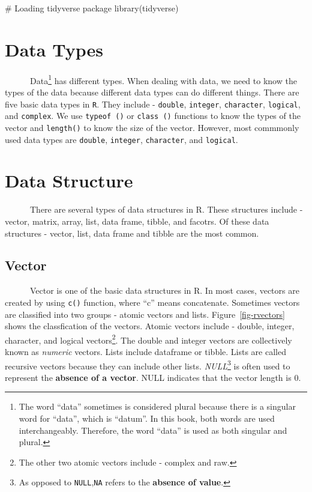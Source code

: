 \documentclass[
  letterpaper,
  DIV=11,
  numbers=noendperiod]{scrreprt}
\newenvironment{Shaded}{\begin{snugshade}}{\end{snugshade}}
\newcommand{\CommentTok}[1]{\textcolor[rgb]{0.37,0.37,0.37}{#1}}
\newcommand{\FunctionTok}[1]{\textcolor[rgb]{0.28,0.35,0.67}{#1}}
\newcommand{\NormalTok}[1]{\textcolor[rgb]{0.00,0.23,0.31}{#1}}
\begin{document}
\begin{Shaded}
\begin{Highlighting}[]
\CommentTok{\# Loading tidyverse package }
\FunctionTok{library}\NormalTok{(tidyverse)}
\end{Highlighting}
\end{Shaded}

\section{Data Types}\label{data-types}

~~~~~~Data\footnote{The word ``data'' sometimes is considered plural
  because there is a singular word for ``data'', which is ``datum''. In
  this book, both words are used interchangeably. Therefore, the word
  ``data'' is used as both singular and plural.} has different types.
When dealing with data, we need to know the types of the data because
different data types can do different things. There are five basic data
types in \texttt{R}. They include - \texttt{double}, \texttt{integer},
\texttt{character}, \texttt{logical}, and \texttt{complex}. We use
\texttt{typeof\ ()} or \texttt{class\ ()} functions to know the types of
the vector and \texttt{length()} to know the size of the vector.
However, most commmonly used data types are \texttt{double},
\texttt{integer}, \texttt{character}, and \texttt{logical}.

\section{Data Structure}\label{data-structure}

~~~~~~There are several types of data structures in R. These structures
include - vector, matrix, array, list, data frame, tibble, and facotrs.
Of these data structures - vector, list, data frame and tibble are the
most common.

\subsection{Vector}\label{vector}

~~~~~~Vector is one of the basic data structures in R. In most cases,
vectors are created by using \texttt{c()} function, where ``c'' means
concatenate. Sometimes vectors are classified into two groups - atomic
vectors and lists. Figure~\ref{fig-rvectors} shows the classfication of
the vectors. Atomic vectors include - double, integer, character, and
logical vectors\footnote{The other two atomic vectors include - complex
  and raw.}. The double and integer vectors are collectively known as
\emph{numeric} vectors. Lists include dataframe or tibble. Lists are
called recursive vectors because they can include other lists.
\emph{NULL}\footnote{As opposed to \texttt{NULL},\texttt{NA} refers to
  the \textbf{absence of value}.} is often used to represent the
\textbf{absence of a vector}. NULL indicates that the vector length is
0.
\end{document}
